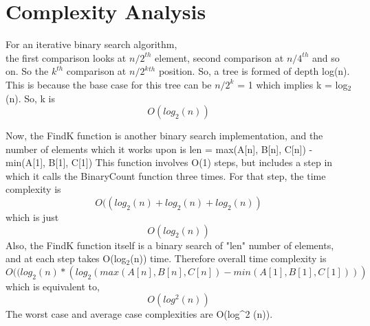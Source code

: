 \documentclass{article}
\begin{document}
\section{Complexity Analysis}
For an iterative binary search algorithm,\\
the first comparison looks at $n/2^{th}$ element, second comparison at  $n/4^{th}$ and so on. So the $k^{th}$ comparison at   $n/2^{k}{^{th}}$ position. So, a tree is formed of depth log(n). This is because the base case for this tree can be  $n/2^{k}$ = 1 which implies k = log$_2$(n). So, k is \[O(log_2 (n))\]



Now, the FindK function is another binary search implementation, and the number of elements which it works upon is len = max(A[n], B[n], C[n]) - min(A[1], B[1], C[1])
This function involves O(1) steps, but includes a step in which it calls the BinaryCount function three times.
For that step, the time complexity is  \[O((log_2 (n) + log_2 (n) + log_2 (n)) \] which is just \[O(log_2 (n))\]
Also, the FindK function itself is a binary search of "len" number of elements, and at each step takes O(log$_2$(n)) time.
Therefore overall time complexity is \[O((log_2 (n) * (log_2 (max(A[n], B[n], C[n]) - min(A[1], B[1], C[1])))\]
which is equivalent to, \[O(log^2 (n))\]
The worst case and average case complexities are O(log^2 (n)).
\end{document}
